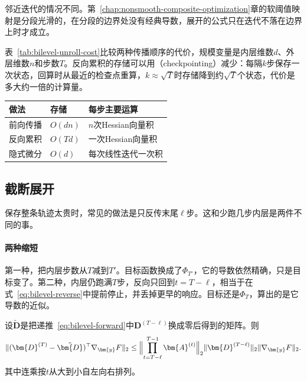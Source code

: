 邻近迭代的情况不同。第~\ref{chap:nonsmooth-composite-optimization}章的软阈值映射是分段光滑的，在分段的边界处没有经典导数，展开的公式只在迭代不落在边界上时才成立。

表~\ref{tab:bilevel-unroll-cost}比较两种传播顺序的代价，规模变量是内层维数$d$、外层维数$n$和步数$T$。反向累积的存储可以用（checkpointing）减少：每隔$k$步保存一次状态，回算时从最近的检查点重算，$k\approx\sqrt{T}$时存储降到约$\sqrt{T}$个状态，代价是多大约一倍的计算量。

\begin{BookInlineTable}
 \centering
 \begin{tabular}{lll}
  \toprule
  做法 & 存储 & 每步主要运算\\
  \midrule
  前向传播 & $O(dn)$ & $n$次Hessian向量积\\
  反向累积 & $O(Td)$ & 一次Hessian向量积\\
  隐式微分 & $O(d)$ & 每次线性迭代一次积\\
  \bottomrule
 \end{tabular}
 \caption{三种超梯度计算的代价。存储只计迭代中保存的向量，隐式微分要求内层已解到解点附近，迭代次数由线性方程的精度决定。}
 \label{tab:bilevel-unroll-cost}
\end{BookInlineTable}

\subsection{截断展开}
\label{sec:bilevel-truncated}

保存整条轨迹太贵时，常见的做法是只反传末尾$\ell$步。这和少跑几步内层是两件不同的事。

\paragraph{两种缩短}
第一种，把内层步数从$T$减到$T'$。目标函数换成了$\Phi_{T'}$，它的导数依然精确，只是目标变了。第二种，内层仍跑满$T$步，反向只回到$t=T-\ell$，相当于在式~\eqref{eq:bilevel-reverse}中提前停止，并丢掉更早的响应。目标还是$\Phi_T$，算出的是它导数的近似。

\begin{theorem}[截断反传的误差]
\label{thm:bilevel-truncation}
设$\tilde{\bm{D}}$是把递推~\eqref{eq:bilevel-forward}中$\bm{D}^{(T-\ell)}$换成零后得到的矩阵。则
\begin{equation}
 \lVert(\bm{D}^{(T)}-\tilde{\bm{D}})^{\top}\nabla_{\bm{y}}F\rVert_2\leq
 \Bigl\lVert\prod_{t=T-\ell}^{T-1}\bm{A}^{(t)}\Bigr\rVert_2\lVert\bm{D}^{(T-\ell)}\rVert_2\lVert\nabla_{\bm{y}}F\rVert_2.
 \label{eq:bilevel-truncation}
\end{equation}
其中连乘按$t$从大到小自左向右排列。
\end{theorem}

